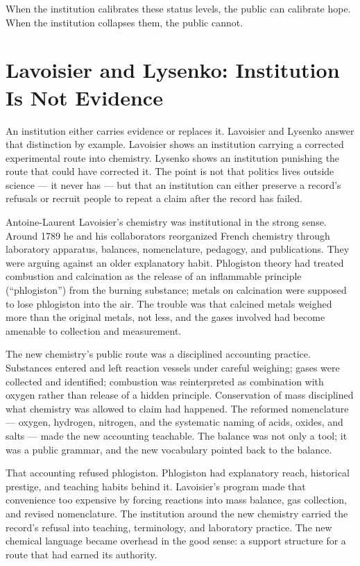 When the institution calibrates these status levels, the public can
calibrate hope. When the institution collapses them, the public cannot.

\section{Lavoisier and Lysenko: Institution Is Not Evidence}

An institution either carries evidence or replaces it. Lavoisier and
Lysenko answer that distinction by example. Lavoisier shows an institution
carrying a corrected experimental route into chemistry. Lysenko shows an
institution punishing the route that could have corrected it. The point is
not that politics lives outside science --- it never has --- but that an
institution can either preserve a record's refusals or recruit people to
repeat a claim after the record has failed.

Antoine-Laurent Lavoisier's chemistry was institutional in the strong
sense. Around 1789 he and his collaborators reorganized French chemistry
through laboratory apparatus, balances, nomenclature, pedagogy, and
publications. They were arguing against an older explanatory habit.
Phlogiston theory had treated combustion and calcination as the release
of an inflammable principle (``phlogiston'') from the burning substance;
metals on calcination were supposed to lose phlogiston into the air. The
trouble was that calcined metals weighed more than the original metals,
not less, and the gases involved had become amenable to collection and
measurement.

The new chemistry's public route was a disciplined accounting practice.
Substances entered and left reaction vessels under careful weighing;
gases were collected and identified; combustion was reinterpreted as
combination with oxygen rather than release of a hidden principle.
Conservation of mass disciplined what chemistry was allowed to claim had
happened. The reformed nomenclature --- oxygen, hydrogen, nitrogen, and
the systematic naming of acids, oxides, and salts --- made the new
accounting teachable. The balance was not only a tool; it was a public
grammar, and the new vocabulary pointed back to the balance.

That accounting refused phlogiston. Phlogiston had explanatory reach,
historical prestige, and teaching habits behind it. Lavoisier's program
made that convenience too expensive by forcing reactions into mass
balance, gas collection, and revised nomenclature. The institution
around the new chemistry carried the record's refusal into teaching,
terminology, and laboratory practice. The new chemical language became
overhead in the good sense: a support structure for a route that had
earned its authority.

